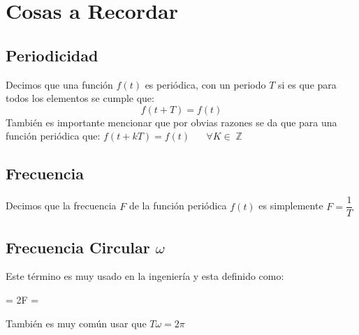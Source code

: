 \documentclass[12pt, fleqn]{report}                             %
\def \Eq {equation}                                             %
\newenvironment{MultiLineEquation*}[1]                          %
        {\begin{\Eq*}\begin{alignedat}{#1}}                         %
        {\end{alignedat}\end{\Eq*}}                                 %
\DeclareMathOperator \Space     {\quad}                         %
\theoremstyle{break}                                            %
\DeclareMathOperator \Integers     {\mathbb{Z}}                 %
\begin{document}
        \clearpage
        \section{Cosas a Recordar}


            \subsection*{Periodicidad}

                Decimos que una función $f(t)$ es periódica, con un periodo $T$ si es que para todos
                los elementos se cumple que:
                \begin{equation*}
                    f(t + T) = f(t)
                \end{equation*}
                También es importante mencionar que por obvias razones se da que para una función
                periódica que: $f(t + kT) = f(t) \Space \forall K \in \Integers$

            \subsection*{Frecuencia}

                Decimos que la frecuencia $F$ de la función periódica $f(t)$
                es simplemente $F = \dfrac{1}{T}$

            \subsection*{Frecuencia Circular $\omega$}

                Este término es muy usado en la ingeniería y esta definido como:
                \begin{MultiLineEquation*}{3}
                    \omega = 2\pi F = 
                \end{MultiLineEquation*}
                También es muy común usar que $T\omega = 2\pi$
                        
\end{document}
